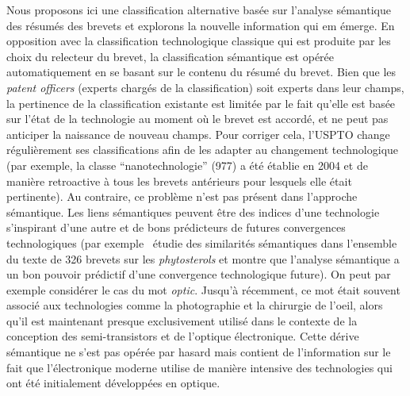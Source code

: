 {Nous proposons ici une classification alternative basée sur l'analyse sémantique des résumés des brevets et explorons la nouvelle information qui em émerge. En opposition avec la classification technologique classique qui est produite par les choix du relecteur du brevet, la classification sémantique est opérée automatiquement en se basant sur le contenu du résumé du brevet. Bien que les \emph{patent officers} (experts chargés de la classification) soit experts dans leur champs, la pertinence de la classification existante est limitée par le fait qu'elle est basée sur l'état de la technologie au moment où le brevet est accordé, et ne peut pas anticiper la naissance de nouveau champs. Pour corriger cela, l'USPTO change régulièrement ses classifications afin de les adapter au changement technologique (par exemple, la classe ``nanotechnologie'' (977) a été établie en 2004 et de manière retroactive à tous les brevets antérieurs pour lesquels elle était pertinente). Au contraire, ce problème n'est pas présent dans l'approche sémantique. Les liens sémantiques peuvent être des indices d'une technologie s'inspirant d'une autre et de bons prédicteurs de futures convergences technologiques (par exemple~\cite{preschitschek2013} étudie des similarités sémantiques dans l'ensemble du texte de 326 brevets sur les \textit{phytosterols} et montre que l'analyse sémantique a un bon pouvoir prédictif d'une convergence technologique future). On peut par exemple considérer le cas du mot \textit{optic}. Jusqu'à récemment, ce mot était souvent associé aux technologies comme la photographie et la chirurgie de l'oeil, alors qu'il est maintenant presque exclusivement utilisé dans le contexte de la conception des semi-transistors et de l'optique électronique. Cette dérive sémantique ne s'est pas opérée par hasard mais contient de l'information sur le fait que l'électronique moderne utilise de manière intensive des technologies qui ont été initialement développées en optique.
}


